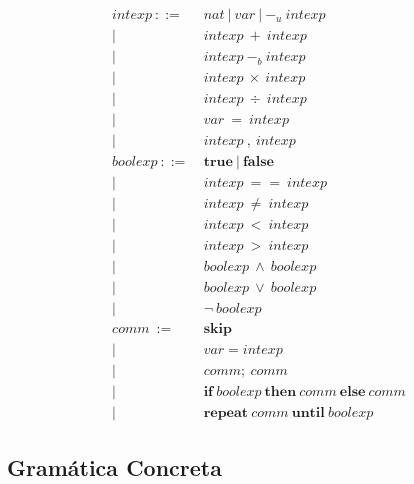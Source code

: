 \documentclass[11pt]{article}
\begin{document}
\begin{align*}
    intexp\ ::=\ & nat\ |\ var\ |\ -_u\ intexp \\
            |\ \ & intexp\ +\ intexp \\ 
            |\ \ & intexp\ -_b\ intexp \\ 
            |\ \ & intexp\ \times\ intexp \\ 
            |\ \ & intexp\ \div\ intexp \\ 
            |\ \ & var\ =\ intexp \\
            |\ \ & intexp\ ,\ intexp \\
    boolexp\ ::=\ & \textbf{true}\ |\ \textbf{false} \\
             |\ \ & intexp\ ==\ intexp \\
             |\ \ & intexp\ \ne\ intexp \\
             |\ \ & intexp\ <\ intexp \\
             |\ \ & intexp\ >\ intexp \\
             |\ \ & boolexp\ \wedge\ boolexp \\
             |\ \ & boolexp\ \vee\ boolexp \\
             |\ \ & \neg\ boolexp \\
    comm\ :=\ & \textbf{skip} \\
          |\ \ & var = intexp \\
          |\ \ & comm;\ comm \\
          |\ \ & \textbf{if}\ boolexp\ \textbf{then}\ comm\ \textbf{else}\ comm \\
          |\ \ & \textbf{repeat}\ comm\ \textbf{until}\ boolexp
\end{align*}

\subsection*{Gramática Concreta}
\end{document}
